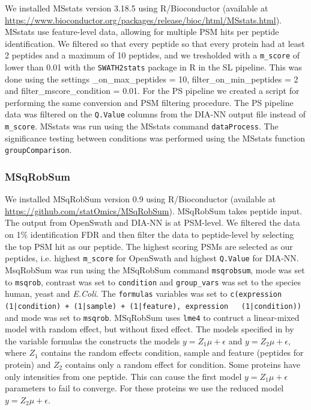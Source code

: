 \documentclass[10pt,letterpaper]{article}
\begin{document}
We installed MSstats version 3.18.5 using R/Bioconductor (available at \url{https://www.bioconductor.org/packages/release/bioc/html/MSstats.html}). MSstats use feature-level data, allowing for multiple PSM hits per peptide identification. We filtered so that every peptide so that every protein had at least 2 peptides and a maximum of 10 peptides, and we tresholded with a \texttt{m\_score} of lower than 0.01 with the \texttt{SWATH2stats} package in R in the SL pipeline. This was done using the settings \_on\_max\_peptides = 10, filter\_on\_min\_peptides = 2 and filter\_mscore\_condition = 0.01. For the PS pipeline we created a script for performing the same conversion and PSM filtering procedure. The PS pipeline data was filtered on the \texttt{Q.Value} columns from the DIA-NN output file instead of \texttt{m\_score}. MSstats was run using the MSstats command \texttt{dataProcess}. The significance testing between conditions was performed using the MSstats function \texttt{groupComparison}.  


\subsubsection*{MSqRobSum}

We installed MSqRobSum version 0.9 using R/Bioconductor (available at \url{https://github.com/statOmics/MSqRobSum}). MSqRobSum takes peptide input. The output from OpenSwath and DIA-NN is at PSM-level. We filtered the data on 1\% identification FDR and then filter the data to peptide-level by selecting the top PSM hit as our peptide. The highest scoring PSMs are selected as our peptides, i.e. highest \texttt{m\_score} for OpenSwath and highest \texttt{Q.Value} for DIA-NN. MsqRobSum was run using the MSqRobSum command \texttt{msqrobsum}, mode was set to \texttt{msqrob}, contrast was set to \texttt{condition} and \texttt{group\_vars} was set to the species human, yeast and \textit{E.Coli}. The \texttt{formulas} variables was set to \texttt{c(expression ~ (1|condition) + (1|sample) + (1|feature), expression ~ (1|condition))} and mode was set to \texttt{msqrob}. %
MSqRobSum uses \texttt{lme4} to contruct a linear-mixed model with random effect, but without fixed effect. The models specified in by the variable formulas the constructs the models $y = Z_1 \mu + \epsilon$ and $y = Z_2 \mu + \epsilon$, where $Z_1$ contains the random effects condition, sample and feature (peptides for protein) and $Z_2$ contains only a random effect for condition. Some proteins have only intensities from one peptide. This can cause the first model $y = Z_1 \mu + \epsilon$ parameters to fail to converge. For these proteins we use the reduced model $y = Z_2 \mu + \epsilon$.
\end{document}
